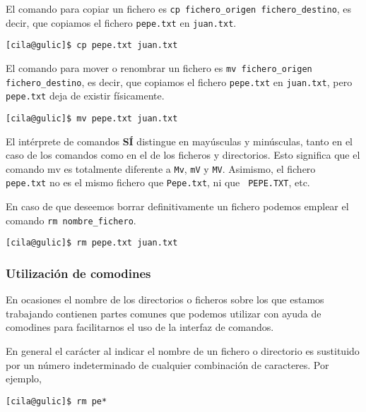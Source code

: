 El  comando  para  copiar  un   fichero  es  {\tt  cp  fichero\_origen
fichero\_destino}, es decir, que copiamos el fichero {\tt pepe.txt} en
{\tt juan.txt}.

\begin{verbatim}
[cila@gulic]$ cp pepe.txt juan.txt
\end{verbatim}

El   comando  para   mover  o   renombrar  un   fichero  es   {\tt  mv
fichero\_origen fichero\_destino},  es decir, que copiamos  el fichero
{\tt pepe.txt} en {\tt juan.txt},  pero {\tt pepe.txt} deja de existir
físicamente.

\begin{verbatim}
[cila@gulic]$ mv pepe.txt juan.txt
\end{verbatim}

\begin{nota}
El  intérprete  de  comandos  \textbf{SÍ} distingue  en  mayúsculas  y
minúsculas,  tanto en  el  caso de  los  comandos como  en  el de  los
ficheros y directorios. Esto significa que el comando mv es totalmente
diferente a {\tt  Mv}, {\tt mV} y {\tt MV}.  Asimismo, el fichero {\tt
pepe.txt}  no es  el mismo  fichero que  {\tt Pepe.txt},  ni que  {\tt
PEPE.TXT}, etc.
\end{nota}

En  caso de  que  deseemos borrar  definitivamente  un fichero  podemos
emplear el comando {\tt rm nombre\_fichero}.

\begin{verbatim}
[cila@gulic]$ rm pepe.txt juan.txt
\end{verbatim}

\subsubsection{Utilización de comodines}

En ocasiones el  nombre de los directorios o ficheros  sobre los que
estamos trabajando  contienen partes comunes que  podemos utilizar con
ayuda  de  comodines  para  facilitarnos  el uso  de  la  interfaz  de
comandos.

En general el carácter {\tt *} al  indicar el nombre de un fichero o
directorio  es sustituido  por  un número  indeterminado de  cualquier
combinación de caracteres. Por ejemplo,

\begin{verbatim}
[cila@gulic]$ rm pe*
\end{verbatim}

